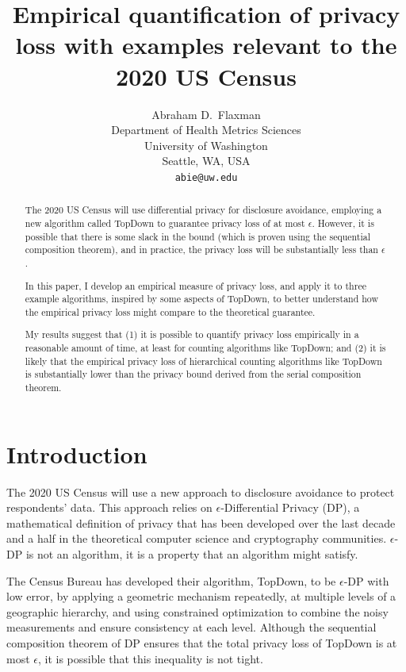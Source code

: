 \documentclass{article}
\title{Empirical quantification of privacy loss with examples relevant to the 2020 US Census}
\author{%
  Abraham D.~Flaxman \\
  Department of Health Metrics Sciences\\
  University of Washington\\
  Seattle, WA, USA \\
  \texttt{abie@uw.edu} \\
}
\begin{document}
\maketitle

\begin{abstract}
  The 2020 US Census will use differential privacy for disclosure avoidance, employing a new algorithm called TopDown to guarantee privacy loss of at most $\epsilon$.  However, it is possible that there is some slack in the bound (which is proven using the sequential composition theorem), and in practice, the privacy loss will be substantially less than $\epsilon$.
  
  In this paper, I develop an empirical measure of privacy loss, and apply it to three  example algorithms, inspired by some aspects of TopDown, to better understand how the empirical privacy loss might compare to the theoretical guarantee.
  
  My results suggest that (1) it is possible to quantify privacy loss empirically in a reasonable amount of time, at least for counting algorithms like TopDown; and (2) it is likely that the empirical privacy loss of hierarchical counting algorithms like TopDown is substantially lower than the privacy bound derived from the serial composition theorem.
\end{abstract}

\section{Introduction}

The 2020 US Census will use a new approach to disclosure avoidance to protect respondents’ data.\cite{abowd2018disclosure} This approach relies on $\epsilon$-Differential Privacy (DP), a mathematical definition of privacy that has been developed over the last decade and a half in the theoretical computer science and cryptography communities. $\epsilon$-DP is not an algorithm, it is a property that an algorithm might satisfy.\cite{dwork2014algorithmic}

The Census Bureau has developed their algorithm, TopDown, to be $\epsilon$-DP with low error, by applying a geometric mechanism repeatedly, at multiple levels of a geographic hierarchy, and using constrained optimization to combine the noisy measurements and ensure consistency at each level.\cite{abowd2019census}  Although the sequential composition theorem of DP ensures that the total privacy loss of TopDown is at most $\epsilon$, it is possible that this inequality is not tight.
\end{document}

